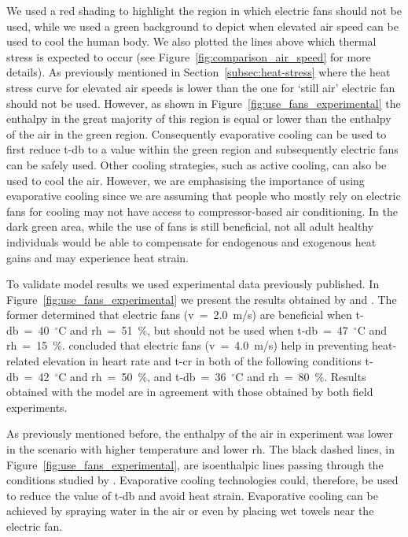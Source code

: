 We used a red shading to highlight the region in which electric fans should not be used, while we used a green background to depict when elevated air speed can be used to cool the human body.
We also plotted the lines above which thermal stress is expected to occur (see Figure~\ref{fig:comparison_air_speed} for more details).
As previously mentioned in Section~\ref{subsec:heat-stress} where the heat stress curve for elevated air speeds is lower than the one for `still air' electric fan should not be used.
 However, as shown in Figure~\ref{fig:use_fans_experimental} the enthalpy in the great majority of this region is equal or lower than the enthalpy of the air in the green region.
 Consequently evaporative cooling can be used to first reduce \ac{t-db} to a value within the green region and subsequently electric fans can be safely used.
 Other cooling strategies, such as active cooling, can also be used to cool the air.
 However, we are emphasising the importance of using evaporative cooling since we are assuming that people who mostly rely on electric fans for cooling may not have access to compressor-based air conditioning.
In the dark green area, while the use of fans is still beneficial, not all adult healthy individuals would be able to compensate for endogenous and exogenous heat gains and may experience heat strain.

To validate  model results we used experimental data previously published.
In Figure~\ref{fig:use_fans_experimental} we present the results obtained by  and .
The former determined that electric fans (\ac{v}~=~2.0~m/s) are beneficial when \ac{t-db}~=~40~$^{\circ}$C and \ac{rh}~=~51~\%, but should not be used when \ac{t-db}~=~47~$^{\circ}$C and \ac{rh}~=~15~\%.
 concluded that electric fans (\ac{v}~=~4.0~m/s) help in preventing heat-related elevation in heart rate and \ac{t-cr} in both of the following conditions \ac{t-db}~=~42~$^{\circ}$C and \ac{rh}~=~50~\%, and \ac{t-db}~=~36~$^{\circ}$C and \ac{rh}~=~80~\%.
Results obtained with the  model are in agreement with those obtained by both field experiments.

As previously mentioned before, the enthalpy of the air in  experiment was lower in the scenario with higher temperature and lower \ac{rh}.
The black dashed lines, in Figure~\ref{fig:use_fans_experimental}, are isoenthalpic lines passing through the conditions studied by .
Evaporative cooling technologies could, therefore, be used to reduce the value of \ac{t-db} and avoid heat strain.
Evaporative cooling can be achieved by spraying water in the air or even by placing wet towels near the electric fan.

